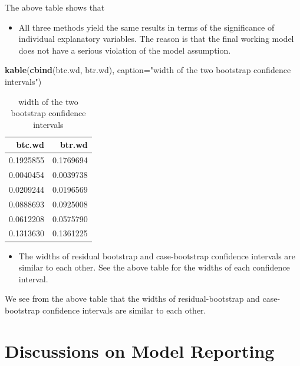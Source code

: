\documentclass[
]{book}
\newenvironment{Shaded}{\begin{snugshade}}{\end{snugshade}}
\newcommand{\AttributeTok}[1]{\textcolor[rgb]{0.13,0.29,0.53}{#1}}
\newcommand{\FunctionTok}[1]{\textcolor[rgb]{0.13,0.29,0.53}{\textbf{#1}}}
\newcommand{\NormalTok}[1]{#1}
\newcommand{\StringTok}[1]{\textcolor[rgb]{0.31,0.60,0.02}{#1}}
\providecommand{\tightlist}{%
  \setlength{\itemsep}{0pt}\setlength{\parskip}{0pt}}
\begin{document}
The above table shows that

\begin{itemize}
\tightlist
\item
  All three methods yield the same results in terms of the significance of individual explanatory variables. The reason is that the final working model does not have a serious violation of the model assumption.
\end{itemize}

\begin{Shaded}
\begin{Highlighting}[]
\FunctionTok{kable}\NormalTok{(}\FunctionTok{cbind}\NormalTok{(btc.wd, btr.wd), }\AttributeTok{caption=}\StringTok{"width of the two bootstrap confidence intervals"}\NormalTok{)}
\end{Highlighting}
\end{Shaded}

\begin{table}

\caption{\label{tab:unnamed-chunk-113}width of the two bootstrap confidence intervals}
\centering
\begin{tabular}[t]{r|r}
\hline
btc.wd & btr.wd\\
\hline
0.1925855 & 0.1769694\\
\hline
0.0040454 & 0.0039738\\
\hline
0.0209244 & 0.0196569\\
\hline
0.0888693 & 0.0925008\\
\hline
0.0612208 & 0.0575790\\
\hline
0.1313630 & 0.1361225\\
\hline
\end{tabular}
\end{table}

\begin{itemize}
\tightlist
\item
  The widths of residual bootstrap and case-bootstrap confidence intervals are similar to each other. See the above table for the widths of each confidence interval.
\end{itemize}

We see from the above table that the widths of residual-bootstrap and case-bootstrap confidence intervals are similar to each other.

\hfill\break

\hypertarget{discussions-on-model-reporting}{%
\section{Discussions on Model Reporting}\label{discussions-on-model-reporting}}
\end{document}
